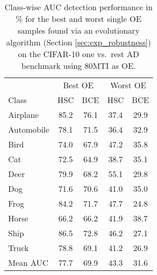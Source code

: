 \documentclass[10pt]{article} \usepackage[accepted]{stylefiles/tmlr}
\begin{document}
\begin{table*}[th]
    \caption{Class-wise AUC detection performance in \% for the best and worst single OE samples found via an evolutionary algorithm (Section \ref{sec:exp_robustness}) on the CIFAR-10 one vs.~rest AD benchmark using 80MTI as OE.}
    \label{tab:evolve_classwise_cifar_plain}
    \vspace{0.5em}
    \centering\small
    \begin{tabular}{lcccc} 
\toprule 
 & \multicolumn{2}{c|}{Best OE} & \multicolumn{2}{c}{Worst OE} \\ 
Class & HSC & \multicolumn{1}{c|}{BCE} & HSC & \multicolumn{1}{c}{BCE} \\ 
\midrule 
Airplane & 85.2 & \multicolumn{1}{c|}{76.1} & 37.4 & \multicolumn{1}{c}{29.9} \\ 
Automobile & 78.1 & \multicolumn{1}{c|}{71.5} & 36.4 & \multicolumn{1}{c}{32.9} \\ 
Bird & 74.0 & \multicolumn{1}{c|}{67.9} & 47.2 & \multicolumn{1}{c}{35.8} \\ 
Cat & 72.5 & \multicolumn{1}{c|}{64.9} & 38.7 & \multicolumn{1}{c}{35.1} \\ 
Deer & 79.9 & \multicolumn{1}{c|}{68.2} & 55.1 & \multicolumn{1}{c}{29.8} \\ 
Dog & 71.6 & \multicolumn{1}{c|}{70.6} & 41.0 & \multicolumn{1}{c}{35.0} \\ 
Frog & 84.2 & \multicolumn{1}{c|}{71.7} & 47.7 & \multicolumn{1}{c}{24.8} \\ 
Horse & 66.2 & \multicolumn{1}{c|}{66.2} & 41.9 & \multicolumn{1}{c}{38.7} \\ 
Ship & 86.5 & \multicolumn{1}{c|}{72.8} & 46.2 & \multicolumn{1}{c}{27.1} \\ 
Truck & 78.8 & \multicolumn{1}{c|}{69.1} & 41.2 & \multicolumn{1}{c}{26.9} \\ 
\midrule 
Mean AUC & 77.7 & \multicolumn{1}{c|}{69.9} & 43.3 & \multicolumn{1}{c}{31.6} \\ 
\bottomrule 
\end{tabular} \end{table*}
\end{document}
